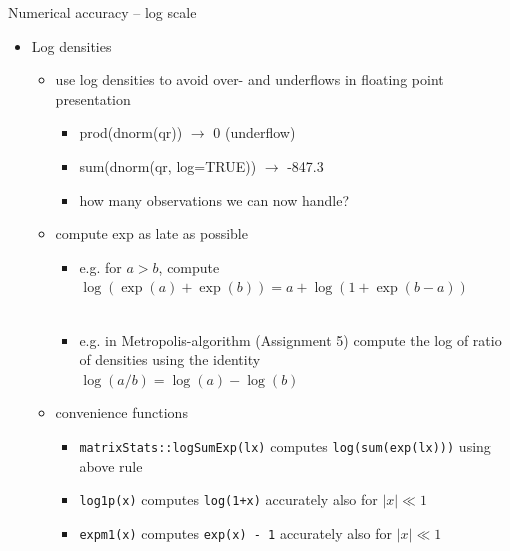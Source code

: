 \documentclass[english,t]{beamer}
\begin{document}
\begin{frame}{Numerical accuracy -- log scale}

  \begin{itemize}
  \item Log densities
    \begin{itemize}
    \item use log densities to avoid over- and underflows in floating
      point presentation
      \begin{itemize}
      \item {\color{navyblue} prod(dnorm(qr)) $\rightarrow$} {\color{red} 0 (underflow)}
      \item {\color{navyblue} sum(dnorm(qr, log=TRUE)) $\rightarrow$} {\color{darkgreen} -847.3}
      \item<2-> how many observations we can now handle? %
    \end{itemize}
    \item<3-> compute exp as late as possible
      \begin{itemize}
      \item<4-> e.g. for $a>b$, compute $\log(\exp(a)+\exp(b)) = a + \log(1+\exp(b-a))$\\
        \\
      \item<7-> e.g. in Metropolis-algorithm (Assignment 5) compute the log of ratio of densities using the identity\\
        $\log(a/b)=\log(a)-\log(b)$
    \end{itemize}
  \item<8-> convenience functions
    \begin{itemize}
    \item \texttt{matrixStats::logSumExp(lx)} computes
      \texttt{log(sum(exp(lx)))} using above rule
    \item \texttt{log1p(x)} computes \texttt{log(1+x)} accurately also for $|x| \ll 1$
    \item \texttt{expm1(x)} computes \texttt{exp(x) - 1} accurately also for $|x| \ll 1$
    \end{itemize}
    \end{itemize}
  \end{itemize}

\end{frame}
\end{document}
